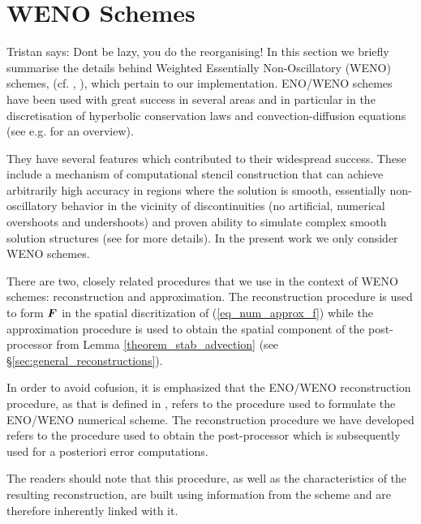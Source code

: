 \documentclass[final]{amsart}
\renewcommand{\vec}[1]{\geovec{#1}}
\newcommand{\tristan}[1]{{\color{purple} Tristan says:  #1 }}
\numberwithin{equation}{section}
\begin{document}
\section{WENO Schemes}\label{sec:ENO_WENO_schemes}
\tristan{Dont be lazy, you do the reorganising!}
In this section we briefly summarise the details behind Weighted Essentially Non-Oscillatory (WENO) schemes, (cf. \cite{jiang1996efficient}, \cite{shu1998essentially}), which pertain to our implementation.  ENO/WENO schemes have been used with great success in several areas and in particular in the discretisation of hyperbolic conservation laws and convection-diffusion equations (see e.g. \cite{shu2020essentially} for an overview).   

They have several features which contributed to their widespread success.  These include a mechanism of computational stencil construction that can achieve arbitrarily high accuracy in regions where the solution is smooth, essentially non-oscillatory behavior in the vicinity of discontinuities (no artificial, numerical overshoots and undershoots) and proven ability to simulate complex smooth solution structures (see \cite{shu1998essentially} for more details).  In the present work we only consider WENO schemes.

There are two, closely related procedures that we use in the context of WENO schemes: reconstruction and approximation. The reconstruction procedure is used to form $\vec{F}$ in the spatial discritization of (\ref{eq_num_approx_f}) while the approximation procedure is used to obtain the spatial component of the post-processor from Lemma \ref{theorem_stab_advection} (see \S\ref{sec:general_reconstructions}). 


\begin{Rem}
	In order to avoid cofusion, it is emphasized that the ENO/WENO reconstruction procedure, as that is defined in \cite{shu1998essentially}, refers to the procedure  used to formulate the ENO/WENO numerical scheme.
	The reconstruction procedure we have developed refers to the procedure used to obtain the post-processor which is subsequently used for a posteriori error computations.  
	
	The readers should note that this procedure, as well as the characteristics of the resulting reconstruction,  are built using information from the scheme and are therefore inherently linked with it.
\end{Rem}
\end{document}
